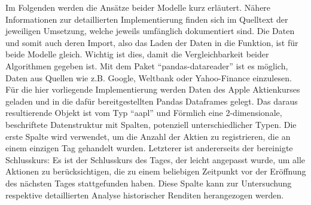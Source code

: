 Im Folgenden werden die Ansätze beider Modelle kurz erläutert. Nähere Informationen zur detaillierten Implementierung finden sich im Quelltext der jeweiligen Umsetzung, welche jeweils umfänglich dokumentiert sind.
Die Daten und somit auch deren Import, also das Laden der Daten in die Funktion, ist für beide Modelle gleich. Wichtig ist dies, damit die Vergleichbarkeit beider Algorithmen gegeben ist. Mit dem Paket \enquote{pandas-datareader} ist es möglich, Daten aus Quellen wie z.B. Google, Weltbank oder Yahoo-Finance einzulesen. \cite{willems_2019} Für die hier vorliegende Implementierung werden Daten des Apple Aktienkurses geladen und in die dafür bereitgestellten Pandas Dataframes gelegt. Das daraus resultierende Objekt ist vom Typ \enquote{aapl} und Förmlich eine 2-dimensionale, beschriftete Datenstruktur mit Spalten, potenziell unterschiedlicher Typen. \cite{willems_2019} Die erste Spalte wird verwendet, um die Anzahl der Aktien zu registrieren, die an einem einzigen Tag gehandelt wurden. \cite{willems_2019} Letzterer ist andererseits der bereinigte Schlusskurs: Es ist der Schlusskurs des Tages, der leicht angepasst wurde, um alle Aktionen zu berücksichtigen, die zu einem beliebigen Zeitpunkt vor der Eröffnung des nächsten Tages stattgefunden haben.  \cite{willems_2019} Diese Spalte kann zur Untersuchung respektive detaillierten Analyse historischer Renditen herangezogen werden. \cite{willems_2019} 

